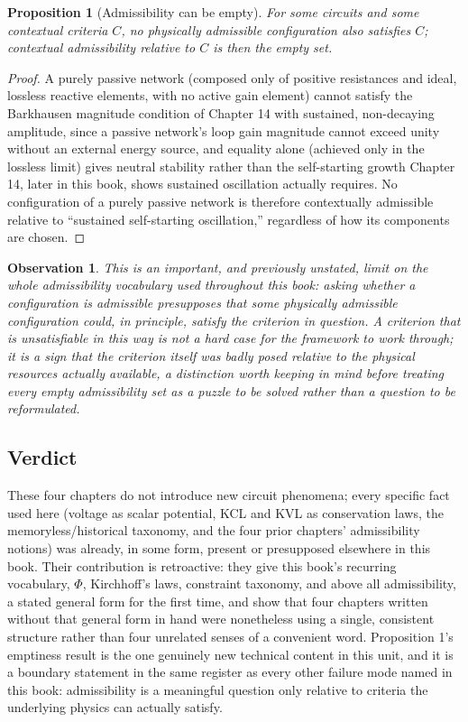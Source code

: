 \documentclass[12pt]{article}
\newtheorem{proposition}{Proposition}
\newtheorem{observation}{Observation}
\begin{document}
\begin{proposition}[Admissibility can be empty]
For some circuits and some contextual criteria $C$, no physically admissible configuration also satisfies $C$; contextual admissibility relative to $C$ is then the empty set.
\end{proposition}

\begin{proof}
A purely passive network (composed only of positive resistances and ideal, lossless reactive elements, with no active gain element) cannot satisfy the Barkhausen magnitude condition of Chapter 14 with sustained, non-decaying amplitude, since a passive network's loop gain magnitude cannot exceed unity without an external energy source, and equality alone (achieved only in the lossless limit) gives neutral stability rather than the self-starting growth Chapter 14, later in this book, shows sustained oscillation actually requires. No configuration of a purely passive network is therefore contextually admissible relative to ``sustained self-starting oscillation,'' regardless of how its components are chosen.
\end{proof}

\begin{observation}
This is an important, and previously unstated, limit on the whole admissibility vocabulary used throughout this book: asking whether a configuration is admissible presupposes that some physically admissible configuration could, in principle, satisfy the criterion in question. A criterion that is unsatisfiable in this way is not a hard case for the framework to work through; it is a sign that the criterion itself was badly posed relative to the physical resources actually available, a distinction worth keeping in mind before treating every empty admissibility set as a puzzle to be solved rather than a question to be reformulated.
\end{observation}

\subsection*{Verdict}

These four chapters do not introduce new circuit phenomena; every specific fact used here (voltage as scalar potential, KCL and KVL as conservation laws, the memoryless/historical taxonomy, and the four prior chapters' admissibility notions) was already, in some form, present or presupposed elsewhere in this book. Their contribution is retroactive: they give this book's recurring vocabulary, $\Phi$, Kirchhoff's laws, constraint taxonomy, and above all admissibility, a stated general form for the first time, and show that four chapters written without that general form in hand were nonetheless using a single, consistent structure rather than four unrelated senses of a convenient word. Proposition 1's emptiness result is the one genuinely new technical content in this unit, and it is a boundary statement in the same register as every other failure mode named in this book: admissibility is a meaningful question only relative to criteria the underlying physics can actually satisfy.
\end{document}
